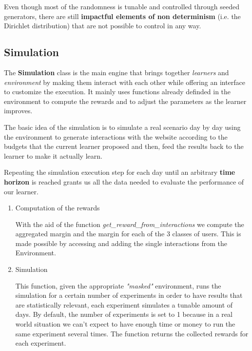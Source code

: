 Even though most of the randomness is tunable and controlled through seeded generators, there are still \textbf{impactful elements of non determinism} (i.e. the Dirichlet distribution) that are not possible to control in any way.


\subsection{Simulation}

The \textbf{Simulation} class is the main engine that brings together \textit{learners} and \textit{environment} by making them interact with each other while offering an interface to customize the execution. It mainly uses functions already definded in the environment to compute the rewards and to adjust the parameters as the learner improves.

The basic idea of the simulation is to simulate a real scenario day by day using the environment to generate interactions with the website according to the budgets that the current learner proposed and then, feed the results back to the learner to make it actually learn.

Repeating the simulation execution step for each day until an arbitrary \textbf{time horizon} is reached grants us all the data needed to evaluate the performance of our learner.

\begin{enumerate}
    \item Computation of the rewards

    With the aid of the function \textit{get\_reward\_from\_interactions} we compute the aggregated margin and the margin for each of the 3 classes of users. This is made possible by accessing and adding the single interactions from the Environment.

    \item Simulation

    This function, given the appropriate \textit{"masked"} environment, runs the simulation for a certain number of experiments in order to have results that are statistically relevant, each experiment simulates a tunable amount of days. By default, the number of experiments is set to 1 because in a real world situation we can't expect to have enough time or money to run the same experiment several times. The function returns the collected rewards for each experiment.
\end{enumerate}

